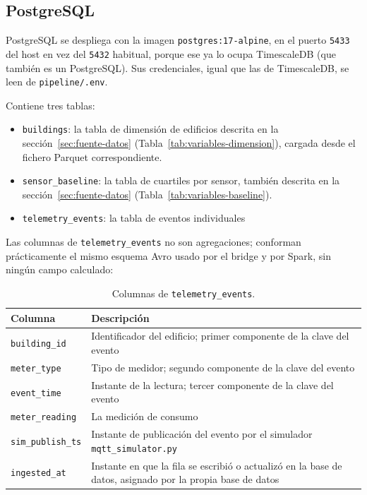 \subsection{PostgreSQL}

PostgreSQL se despliega con la imagen \texttt{postgres:17-alpine}, en el puerto \texttt{5433} del host en vez del \texttt{5432} habitual, porque ese ya lo ocupa TimescaleDB (que también es un PostgreSQL). Sus credenciales, igual que las de TimescaleDB, se leen de \texttt{pipeline/.env}.

Contiene tres tablas:

\begin{itemize}
  \item \texttt{buildings}: la tabla de dimensión de edificios descrita en la sección~\ref{sec:fuente-datos} (Tabla~\ref{tab:variables-dimension}), cargada desde el fichero Parquet correspondiente.
  \item \texttt{sensor\_baseline}: la tabla de cuartiles por sensor, también descrita en la sección~\ref{sec:fuente-datos} (Tabla~\ref{tab:variables-baseline}).
  \item \texttt{telemetry\_events}: la tabla de eventos individuales 
\end{itemize}

Las columnas de \texttt{telemetry\_events} no son agregaciones; conforman prácticamente el mismo esquema Avro usado por el bridge y por Spark, sin ningún campo calculado:

\begin{table}[H]
  \centering
  \begin{tabular}{|l|p{9cm}|}
    \hline
    \textbf{Columna} & \textbf{Descripción} \\ \hline
    \texttt{building\_id} & Identificador del edificio; primer componente de la clave del evento \\ \hline
    \texttt{meter\_type} & Tipo de medidor; segundo componente de la clave del evento \\ \hline
    \texttt{event\_time} & Instante de la lectura; tercer componente de la clave del evento \\ \hline
    \texttt{meter\_reading} & La medición de consumo \\ \hline
    \texttt{sim\_publish\_ts} & Instante de publicación del evento por el simulador \texttt{mqtt\_simulator.py} \\ \hline
    \texttt{ingested\_at} & Instante en que la fila se escribió o actualizó en la base de datos, asignado por la propia base de datos \\ \hline
  \end{tabular}
  \caption{Columnas de \texttt{telemetry\_events}.}
  \label{tab:columnas-telemetry-events}
\end{table}

